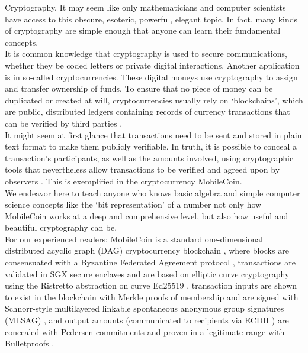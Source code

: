 

Cryptography. It may seem like only mathematicians and computer scientists have access to this obscure, esoteric, powerful, elegant topic. In fact, many kinds of cryptography are simple enough that anyone can learn their fundamental concepts.
\\ \newline
It is common knowledge that cryptography is used to secure communications, whether they be coded letters or private digital interactions. Another application is in so-called cryptocurrencies. These digital moneys use cryptography to assign and transfer ownership of funds. To ensure that no piece of money can be duplicated or created at will, cryptocurrencies usually rely on `blockchains', which are public, distributed ledgers containing records of currency transactions that can be verified by third parties \cite{Nakamoto_bitcoin}.
\\ \newline
It might seem at first glance that transactions need to be sent and stored in plain text format to make them publicly verifiable. In truth, it is possible to conceal a transaction's participants, as well as the amounts involved, using cryptographic tools that nevertheless allow transactions to be verified and agreed upon by observers \cite{cryptoNoteWhitePaper}. This is exemplified in the cryptocurrency MobileCoin.
\\ \newline
We endeavor here to teach anyone who knows basic algebra and simple computer science concepts like the `bit representation' of a number not only how MobileCoin works at a deep and comprehensive level, but also how useful and beautiful cryptography can be.
\\ \newline
For our experienced readers: MobileCoin is a standard one-dimensional distributed acyclic graph (DAG) cryptocurrency blockchain \cite{Nakamoto_bitcoin}, where blocks are consensuated with a Byzantine Federated Agreement protocol \cite{stellar-consensus-protocol}, transactions are validated in SGX secure enclaves \cite{intel-sgx-explained-advanced} and are based on elliptic curve cryptography using the Ristretto abstraction \cite{ristretto} on curve Ed25519 \cite{Bernstein2012-high-speed-high-security-ed25519}, transaction inputs are shown to exist in the blockchain with Merkle proofs of membership \cite{merkle-tree} and are signed with Schnorr-style multilayered linkable spontaneous anonymous group signatures (MLSAG) \cite{MRL-0005-ringct}, and output amounts (communicated to recipients via ECDH \cite{Diffie-Hellman}) are concealed with Pedersen commitments \cite{maxwell-ct-2} and proven in a legitimate range with Bulletproofs \cite{Bulletproofs_paper}. %